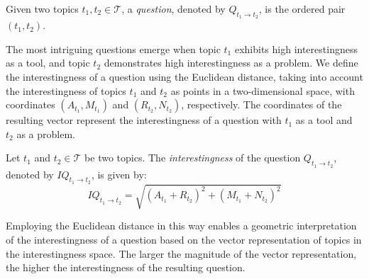 \begin{definition}
Given two topics $t_1, t_2 \in \mathcal{T}$, a \emph{question}, denoted by $Q_{t_1 \rightarrow t_2}$, is the ordered pair $\left(t_1, t_2\right)$.
\end{definition}

The most intriguing questions emerge when topic $t_1$ exhibits high interestingness as a tool, and topic $t_2$ demonstrates high interestingness as a problem. We define the interestingness of a question using the Euclidean distance, taking into account the interestingness of topics $t_1$ and $t_2$ as points in a two-dimensional space, with coordinates $(A_{t_1}, M_{t_1})$ and $(R_{t_2}, N_{t_2})$, respectively. The coordinates of the resulting vector represent the interestingness of a question with $t_1$ as a tool and $t_2$ as a problem.

\begin{definition}
Let $t_1$ and $t_2 \in \mathcal{T}$ be two topics. The \emph{interestingness} of the question $Q_{t_1 \rightarrow t_2}$, denoted by $IQ_{t_1 \rightarrow t_2}$, is given by:
\[
IQ_{t_1 \rightarrow t_2} = \sqrt{ (A_{t_1} + R_{t_2})^2 + (M_{t_1} + N_{t_2})^2 }
\]
\end{definition}

Employing the Euclidean distance in this way enables a geometric interpretation of the interestingness of a question based on the vector representation of topics in the interestingness space. The larger the magnitude of the vector representation, the higher the interestingness of the resulting question.


